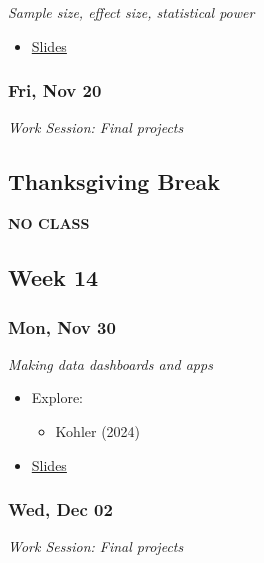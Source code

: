 \documentclass[
  letterpaper,
  DIV=11,
  numbers=noendperiod]{scrartcl}
\providecommand{\tightlist}{%
  \setlength{\itemsep}{0pt}\setlength{\parskip}{0pt}}
\begin{document}
\emph{Sample size, effect size, statistical power}

\begin{itemize}
\tightlist
\item
  \href{404.qmd}{Slides}
\end{itemize}

\subsubsection*{Fri, Nov 20}\label{fri-nov-20}

\emph{Work Session: Final projects}

\subsection*{Thanksgiving Break}\label{thanksgiving-break}

\textbf{NO CLASS}

\subsection*{Week 14}\label{week-14}

\subsubsection*{Mon, Nov 30}\label{mon-nov-30}

\emph{Making data dashboards and apps}

\begin{itemize}
\tightlist
\item
  Explore:

  \begin{itemize}
  \tightlist
  \item
    Kohler (2024)
  \end{itemize}
\item
  \href{404.qmd}{Slides}
\end{itemize}

\subsubsection*{Wed, Dec 02}\label{wed-dec-02}

\emph{Work Session: Final projects}
\end{document}

